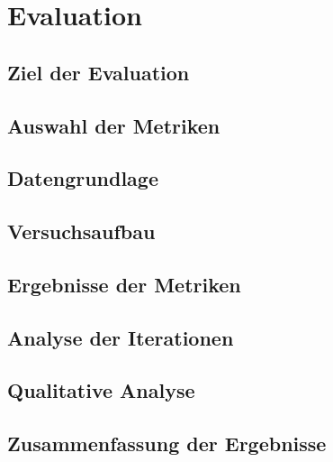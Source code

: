 \chapter{Evaluation}\label{ch:evaluation}


\section{Ziel der Evaluation}



\section{Auswahl der Metriken}


\section{Datengrundlage}


\section{Versuchsaufbau}


\section{Ergebnisse der Metriken}


\section{Analyse der Iterationen}


\section{Qualitative Analyse}


\section{Zusammenfassung der Ergebnisse}
